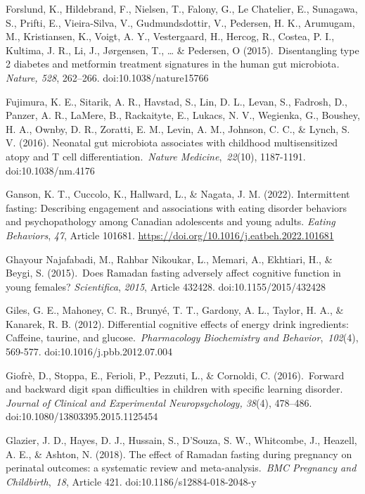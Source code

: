\documentclass[authordate, empirical]{jote-new-article}
\begin{document}
Forslund, K., Hildebrand, F., Nielsen, T., Falony, G., Le Chatelier, E., Sunagawa, S., Prifti, E., Vieira-Silva, V., Gudmundsdottir, V., Pedersen, H. K., Arumugam, M., Kristiansen, K., Voigt, A. Y., Vestergaard, H., Hercog, R., Costea, P. I., Kultima, J. R., Li, J., Jørgensen, T., … \& Pedersen, O (2015). Disentangling type 2 diabetes and metformin treatment signatures in the human gut microbiota\emph{. Nature, 528}, 262--266. doi:10.1038/nature15766



Fujimura, K. E., Sitarik, A. R., Havstad, S., Lin, D. L., Levan, S., Fadrosh, D., Panzer, A. R., LaMere, B., Rackaityte, E., Lukacs, N. V., Wegienka, G., Boushey, H. A., Ownby, D. R., Zoratti, E. M., Levin, A. M., Johnson, C. C., \& Lynch, S. V. (2016). Neonatal gut microbiota associates with childhood multisensitized atopy and T cell differentiation. \emph{Nature Medicine}, \emph{22}(10), 1187-1191. doi:10.1038/nm.4176



Ganson, K. T., Cuccolo, K., Hallward, L., \& Nagata, J. M. (2022). Intermittent fasting: Describing engagement and associations with eating disorder behaviors and psychopathology among Canadian adolescents and young adults. \emph{Eating Behaviors}, \emph{47}, Article 101681. \href{https://doi.org/10.1016/j.eatbeh.2022.101681}{https://doi.org/10.1016/j.eatbeh.2022.101681}



Ghayour Najafabadi, M., Rahbar Nikoukar, L., Memari, A., Ekhtiari, H., \& Beygi, S. (2015). Does Ramadan fasting adversely affect cognitive function in young females?\emph{ Scientifica}, \emph{2015}, Article 432428. doi:10.1155/2015/432428



Giles, G. E., Mahoney, C. R., Brunyé, T. T., Gardony, A. L., Taylor, H. A., \& Kanarek, R. B. (2012). Differential cognitive effects of energy drink ingredients: Caffeine, taurine, and glucose. \emph{Pharmacology Biochemistry and Behavior}, \emph{102}(4), 569-577. doi:10.1016/j.pbb.2012.07.004



Giofrè, D., Stoppa, E., Ferioli, P., Pezzuti, L., \& Cornoldi, C. (2016). Forward and backward digit span difficulties in children with specific learning disorder.\emph{ Journal of Clinical and Experimental Neuropsychology, 38}(4), 478--486. doi:10.1080/13803395.2015.1125454



Glazier, J. D., Hayes, D. J., Hussain, S., D'Souza, S. W., Whitcombe, J., Heazell, A. E., \& Ashton, N. (2018). The effect of Ramadan fasting during pregnancy on perinatal outcomes: a systematic review and meta-analysis. \emph{BMC Pregnancy and Childbirth}, \emph{18}, Article 421. doi:10.1186/s12884-018-2048-y
\end{document}
